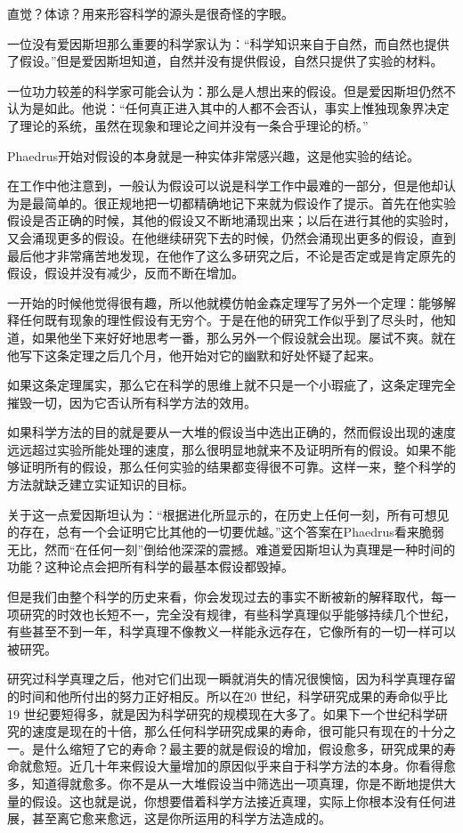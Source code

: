 \documentclass[UTF8]{article}
\begin{document}
\par 直觉？体谅？用来形容科学的源头是很奇怪的字眼。
\par 一位没有爱因斯坦那么重要的科学家认为：“科学知识来自于自然，而自然也提供了假设。”但是爱因斯坦知道，自然并没有提供假设，自然只提供了实验的材料。
\par 一位功力较差的科学家可能会认为：那么是人想出来的假设。但是爱因斯坦仍然不认为是如此。他说：“任何真正进入其中的人都不会否认，事实上惟独现象界决定了理论的系统，虽然在现象和理论之间并没有一条合乎理论的桥。”
\par Phaedrus开始对假设的本身就是一种实体非常感兴趣，这是他实验的结论。
\par 在工作中他注意到，一般认为假设可以说是科学工作中最难的一部分，但是他却认为是最简单的。很正规地把一切都精确地记下来就为假设作了提示。首先在他实验假设是否正确的时候，其他的假设又不断地涌现出来；以后在进行其他的实验时，又会涌现更多的假设。在他继续研究下去的时候，仍然会涌现出更多的假设，直到最后他才非常痛苦地发现，在他作了这么多研究之后，不论是否定或是肯定原先的假设，假设并没有减少，反而不断在增加。
\par 一开始的时候他觉得很有趣，所以他就模仿帕金森定理写了另外一个定理：能够解释任何既有现象的理性假设有无穷个。于是在他的研究工作似乎到了尽头时，他知道，如果他坐下来好好地思考一番，那么另外一个假设就会出现。屡试不爽。就在他写下这条定理之后几个月，他开始对它的幽默和好处怀疑了起来。
\par 如果这条定理属实，那么它在科学的思维上就不只是一个小瑕疵了，这条定理完全摧毁一切，因为它否认所有科学方法的效用。
\par 如果科学方法的目的就是要从一大堆的假设当中选出正确的，然而假设出现的速度远远超过实验所能处理的速度，那么很明显地就来不及证明所有的假设。如果不能够证明所有的假设，那么任何实验的结果都变得很不可靠。这样一来，整个科学的方法就缺乏建立实证知识的目标。
\par 关于这一点爱因斯坦认为：“根据进化所显示的，在历史上任何一刻，所有可想见的存在，总有一个会证明它比其他的一切要优越。”这个答案在Phaedrus看来脆弱无比，然而“在任何一刻”倒给他深深的震撼。难道爱因斯坦认为真理是一种时间的功能？这种论点会把所有科学的最基本假设都毁掉。
\par 但是我们由整个科学的历史来看，你会发现过去的事实不断被新的解释取代，每一项研究的时效也长短不一，完全没有规律，有些科学真理似乎能够持续几个世纪，有些甚至不到一年，科学真理不像教义一样能永远存在，它像所有的一切一样可以被研究。
\par 研究过科学真理之后，他对它们出现一瞬就消失的情况很懊恼，因为科学真理存留的时间和他所付出的努力正好相反。所以在20 世纪，科学研究成果的寿命似乎比19 世纪要短得多，就是因为科学研究的规模现在大多了。如果下一个世纪科学研究的速度是现在的十倍，那么任何科学研究成果的寿命，很可能只有现在的十分之一。是什么缩短了它的寿命？最主要的就是假设的增加，假设愈多，研究成果的寿命就愈短。近几十年来假设大量增加的原因似乎来自于科学方法的本身。你看得愈多，知道得就愈多。你不是从一大堆假设当中筛选出一项真理，你是不断地提供大量的假设。这也就是说，你想要借着科学方法接近真理，实际上你根本没有任何进展，甚至离它愈来愈远，这是你所运用的科学方法造成的。
\end{document}
